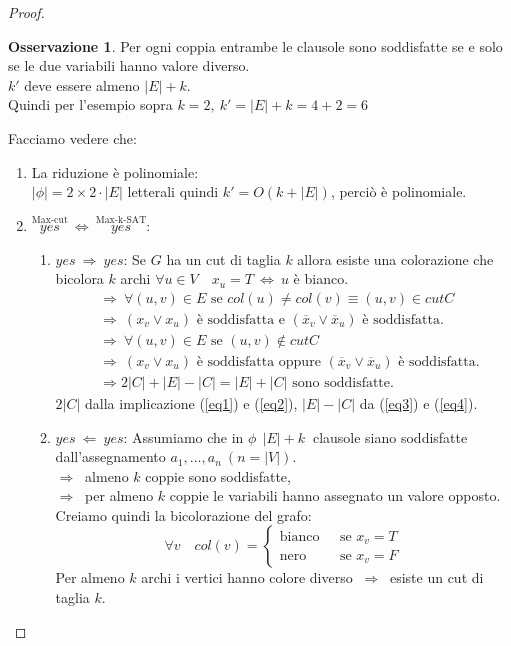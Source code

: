 \documentclass[a4paper]{article}
\theoremstyle{definition}
\newtheorem{obs}{Osservazione}[subsection]
\begin{document}
\begin{proof}
				\begin{obs}
					Per ogni coppia entrambe le clausole sono soddisfatte se e solo se le due variabili hanno valore diverso.\\
					$ k' $ deve essere almeno $ \vert E\vert + k $.\\
					Quindi per l'esempio sopra $ k = 2, \ k' = \vert E\vert + k = 4 + 2 = 6 $
				\end{obs}
				
				Facciamo vedere che:
				\begin{enumerate}[label*=\arabic*.]
					\item La riduzione è polinomiale:\\
					$ |\phi| = 2 \times 2\cdot|E| $ letterali quindi $ k' = O(k + |E|) $, perciò è polinomiale.
					\item $ \stackrel{\text{Max-cut}}{yes}\ \Leftrightarrow\ \stackrel{\text{Max-k-SAT}}{yes} $:
					\begin{enumerate}[label*=\arabic*.]
						\item $ yes\ \Rightarrow\ yes $: Se $ G $ ha un cut di taglia $ k $ allora esiste una colorazione che bicolora $ k $ archi $ \forall u \in V\quad x_u = T\ \Leftrightarrow\ u $ è bianco.
						\begin{align}
							& \Rightarrow \ \forall (u, v) \in E \text{ se } col(u)\neq col(v) \equiv (u, v)\in cut C \label{eq1}\\
							& \Rightarrow \ (x_v\vee x_u) \text{ è soddisfatta e } (\overline{x}_v\vee \overline{x}_u) \text{ è soddisfatta.} \label{eq2}\\
							& \Rightarrow \ \forall (u, v) \in E \text{ se } (u, v)\notin cut C \label{eq3}\\
							& \Rightarrow \ (x_v\vee x_u) \text{ è soddisfatta oppure } (\overline{x}_v\vee \overline{x}_u) \text{ è soddisfatta.} \label{eq4}\\
							& \Rightarrow 2|C| + |E| - |C| = |E| + |C| \text{ sono soddisfatte.}
						\end{align}
						$ 2|C| $ dalla implicazione (\ref{eq1}) e (\ref{eq2}), $ |E| - |C| $ da (\ref{eq3}) e (\ref{eq4}).
						\item $ yes\ \Leftarrow\ yes $: Assumiamo che in $ \phi \ \ |E| + k \ $ clausole siano soddisfatte dall'assegnamento $ a_1, \dots, a_n\ (n = |V|) $.\\
						$ \Rightarrow \ $ almeno $ k $ coppie sono soddisfatte,\\
						$ \Rightarrow \ $ per almeno $ k $ coppie le variabili hanno assegnato un valore opposto.\\
						Creiamo quindi la bicolorazione del grafo:
						\[
							\forall v\quad col(v) =
							\begin{cases}
								\text{bianco } & \mbox{ se } x_v = T\\
								\text{nero }   & \mbox{ se } x_v = F
							\end{cases}
						\]
						Per almeno $ k $ archi i vertici hanno colore diverso $ \ \Rightarrow\ $ esiste un cut di taglia $ k $.
					\end{enumerate}
				\end{enumerate}
			\end{proof}
			
\end{document}
